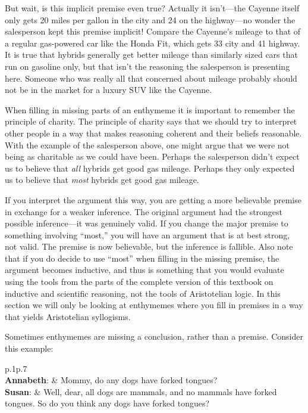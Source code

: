 But wait, is this implicit premise even true? Actually it isn't---the Cayenne itself only gets 20 miles per gallon in the city and 24 on the highway---no wonder the salesperson kept this premise implicit! Compare the Cayenne's mileage to that of a regular gas-powered car like the Honda Fit, which gets 33 city and 41 highway. It is true that hybrids generally get better mileage than similarly sized cars that run on gasoline only, but that isn't the reasoning the salesperson is presenting here. Someone who was really all that concerned about mileage probably should not be in the market for a luxury SUV like the Cayenne.  

When filling in missing parts of an enthymeme it is important to remember the principle of charity. The principle of charity says that we should try to interpret other people in a way that makes reasoning coherent and their beliefs reasonable. With the example of the salesperson above, one might argue that we were not being as charitable as we could have been. Perhaps the salesperson didn't expect us to believe that \textit{all} hybrids get good gas mileage. Perhaps they only expected us to believe that \textit{most} hybrids get good gas mileage. 

If you interpret the argument this way, you are getting a more believable premise in exchange for a weaker inference. The original argument had the strongest possible inference---it was genuinely valid. If you change the major premise to something involving ``most,'' you will have an argument that is at best strong, not  valid. The premise is now believable, but the inference is fallible.   Also note that if you do decide to use ``most'' when filling in the missing premise, the argument becomes inductive, and thus is something that you would evaluate using the tools from the parts of the complete version of this textbook on inductive and scientific reasoning,  \label{ver_var} not the tools of Aristotelian logic. In this section we will only be looking at enthymemes where you fill in premises in a way that yields Aristotelian syllogisms. 

Sometimes enthymemes are missing a conclusion, rather than a premise. Consider this example:

\begin{tabu}{p{.1\linewidth}p{.7\linewidth}}
\\
\textbf{Annabeth}: & Mommy, do any dogs have forked tongues? \\
\textbf{Susan}:  & Well, dear, all dogs are mammals, and no mammals have forked tongues. So do you think any dogs have forked tongues?\\
\end{tabu}

